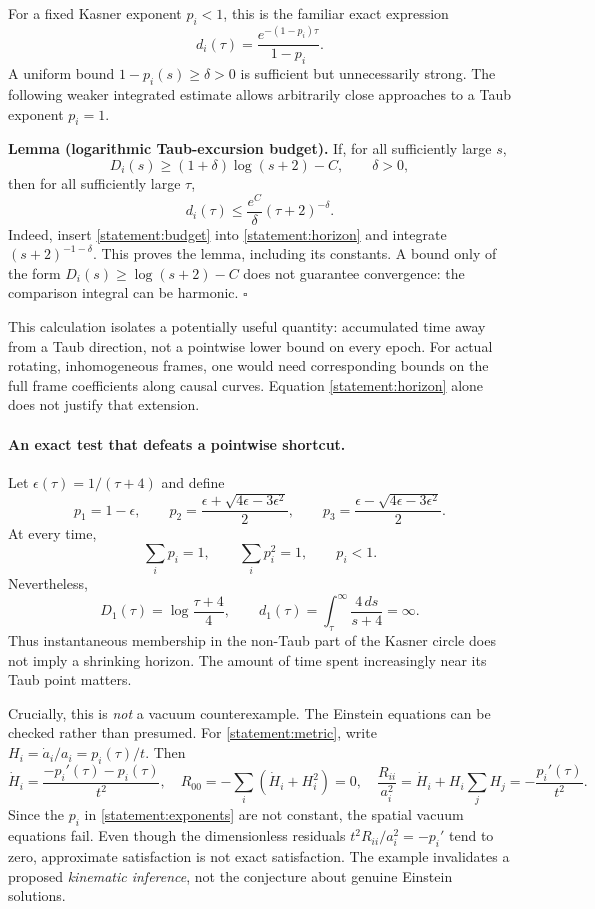 \documentclass[11pt,a4paper]{article}
\numberwithin{equation}{section}
\begin{document}
For a fixed Kasner exponent $p_i<1$, this is the familiar exact expression
\[
 d_i(\tau)=\frac{e^{-(1-p_i)\tau}}{1-p_i}.
\]
A uniform bound $1-p_i(s)\ge\delta>0$ is sufficient but unnecessarily strong.
The following weaker integrated estimate allows arbitrarily close approaches
to a Taub exponent $p_i=1$.

\textbf{Lemma (logarithmic Taub-excursion budget).}
If, for all sufficiently large $s$,
\begin{equation}\label{statement:budget}
 D_i(s)\ge (1+\delta)\log(s+2)-C,
 \qquad \delta>0,
\end{equation}
then for all sufficiently large $\tau$,
\begin{equation}\label{statement:tail}
 d_i(\tau)\le\frac{e^C}{\delta}(\tau+2)^{-\delta}.
\end{equation}
Indeed, insert \eqref{statement:budget} into \eqref{statement:horizon} and integrate
$(s+2)^{-1-\delta}$. This proves the lemma, including its constants.
A bound only of the form $D_i(s)\ge\log(s+2)-C$ does not guarantee convergence:
the comparison integral can be harmonic. $\square$

This calculation isolates a potentially useful quantity: accumulated time
away from a Taub direction, not a pointwise lower bound on every epoch.
For actual rotating, inhomogeneous frames, one would need corresponding
bounds on the full frame coefficients along causal curves. Equation
\eqref{statement:horizon} alone does not justify that extension.

\paragraph{An exact test that defeats a pointwise shortcut.}
Let $\epsilon(\tau)=1/(\tau+4)$ and define
\begin{equation}\label{statement:exponents}
 p_1=1-\epsilon,\qquad
 p_2=\frac{\epsilon+\sqrt{4\epsilon-3\epsilon^2}}2,\qquad
 p_3=\frac{\epsilon-\sqrt{4\epsilon-3\epsilon^2}}2.
\end{equation}
At every time,
\[
 \sum_i p_i=1,\qquad \sum_i p_i^2=1,\qquad p_i<1.
\]
Nevertheless,
\[
 D_1(\tau)=\log\frac{\tau+4}{4},\qquad
 d_1(\tau)=\int_\tau^\infty\frac{4\,ds}{s+4}=\infty.
\]
Thus instantaneous membership in the non-Taub part of the Kasner circle
does not imply a shrinking horizon. The amount of time spent increasingly
near its Taub point matters.

Crucially, this is \emph{not} a vacuum counterexample. The Einstein equations
can be checked rather than presumed. For \eqref{statement:metric}, write
$H_i=\dot a_i/a_i=p_i(\tau)/t$. Then
\[
 \dot H_i=\frac{-p_i'(\tau)-p_i(\tau)}{t^2},
 \quad
 R_{00}=-\sum_i(\dot H_i+H_i^2)=0,
 \quad
 \frac{R_{ii}}{a_i^2}=\dot H_i+H_i\sum_jH_j
                  =-\frac{p_i'(\tau)}{t^2}.
\]
Since the $p_i$ in \eqref{statement:exponents} are not constant, the spatial vacuum
equations fail. Even though the dimensionless residuals
$t^2R_{ii}/a_i^2=-p_i'$ tend to zero, approximate satisfaction is not exact
satisfaction. The example invalidates a proposed \emph{kinematic inference},
not the conjecture about genuine Einstein solutions.
\end{document}
